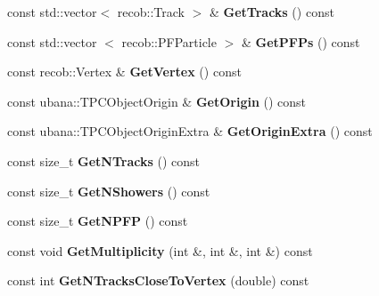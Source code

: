 \begin{DoxyCompactItemize}
\item 
\hypertarget{classubana_1_1TPCObject_a44cc29b00093d89d9f7fe834570d77be}{const std\-::vector$<$ recob\-::\-Track $>$ \& {\bfseries \-Get\-Tracks} () const }\label{classubana_1_1TPCObject_a44cc29b00093d89d9f7fe834570d77be}

\item 
\hypertarget{classubana_1_1TPCObject_a98af6b4a96031938afd18c372cd9d6d6}{const std\-::vector\*
$<$ recob\-::\-P\-F\-Particle $>$ \& {\bfseries \-Get\-P\-F\-Ps} () const }\label{classubana_1_1TPCObject_a98af6b4a96031938afd18c372cd9d6d6}

\item 
\hypertarget{classubana_1_1TPCObject_a3845ae1b31ab6590c5597d157dc01e6a}{const recob\-::\-Vertex \& {\bfseries \-Get\-Vertex} () const }\label{classubana_1_1TPCObject_a3845ae1b31ab6590c5597d157dc01e6a}

\item 
\hypertarget{classubana_1_1TPCObject_a253b4e844b4de1333fa80263c03fceb7}{const ubana\-::\-T\-P\-C\-Object\-Origin \& {\bfseries \-Get\-Origin} () const }\label{classubana_1_1TPCObject_a253b4e844b4de1333fa80263c03fceb7}

\item 
\hypertarget{classubana_1_1TPCObject_a8060105ac9e5d4f3bc88b90695c38c95}{const ubana\-::\-T\-P\-C\-Object\-Origin\-Extra \& {\bfseries \-Get\-Origin\-Extra} () const }\label{classubana_1_1TPCObject_a8060105ac9e5d4f3bc88b90695c38c95}

\item 
\hypertarget{classubana_1_1TPCObject_af083d0e6577c431c1787eb46d313110b}{const size\-\_\-t {\bfseries \-Get\-N\-Tracks} () const }\label{classubana_1_1TPCObject_af083d0e6577c431c1787eb46d313110b}

\item 
\hypertarget{classubana_1_1TPCObject_a988b385655d32acd03121089058d49c4}{const size\-\_\-t {\bfseries \-Get\-N\-Showers} () const }\label{classubana_1_1TPCObject_a988b385655d32acd03121089058d49c4}

\item 
\hypertarget{classubana_1_1TPCObject_a5ec2d5ffe50fe31e05d5d1c4fd486df6}{const size\-\_\-t {\bfseries \-Get\-N\-P\-F\-P} () const }\label{classubana_1_1TPCObject_a5ec2d5ffe50fe31e05d5d1c4fd486df6}

\item 
\hypertarget{classubana_1_1TPCObject_a7c83c2331680f657d7fdcee1298e541b}{const void {\bfseries \-Get\-Multiplicity} (int \&, int \&, int \&) const }\label{classubana_1_1TPCObject_a7c83c2331680f657d7fdcee1298e541b}

\item 
\hypertarget{classubana_1_1TPCObject_aad6393ccb8f6b6e4ba6f36f790729c0b}{const int {\bfseries \-Get\-N\-Tracks\-Close\-To\-Vertex} (double) const }\label{classubana_1_1TPCObject_aad6393ccb8f6b6e4ba6f36f790729c0b}

\end{DoxyCompactItemize}



